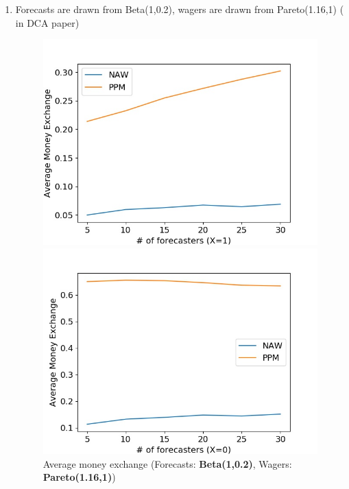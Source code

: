 \documentclass[english,10pt]{article}
\begin{document}
\begin{enumerate}
	
	
	\item Forecasts are drawn from Beta(1,0.2), wagers are drawn from Pareto(1.16,1) ( in DCA paper)
	\begin{figure}[H]
        	\centering
        	\begin{minipage}{0.48\textwidth}
        	\includegraphics[width = \textwidth]{(Beta(1_0dot2)F_Pareto(1dot16_1)W)Avg_MnEx(X=1).jpg}
        	\end{minipage}
        	\begin{minipage}{0.48\textwidth}
        	\includegraphics[width = \textwidth]{(Beta(1_0dot2)F_Pareto(1dot16_1)W)Avg_MnEx(X=0).jpg}
        	\end{minipage}
        	\caption{Average money exchange (Forecasts: \textbf{Beta(1,0.2)}, Wagers: \textbf{Pareto(1.16,1)})}
        	\end{figure}
	
	
	\end{enumerate}
	
\end{document}
